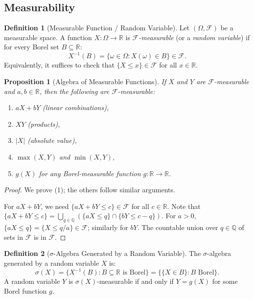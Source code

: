 \documentclass[11pt,a4paper]{article}
\theoremstyle{definition}
\newtheorem{definition}{Definition}[section]
\theoremstyle{plain}
\newtheorem{proposition}[theorem]{Proposition}
\theoremstyle{remark}
\newcommand{\R}{\mathbb{R}}
\begin{document}
\subsection{Measurability}
\label{subsec:measurability}

\begin{definition}[Measurable Function / Random Variable]
\label{def:measurable}
Let $(\Omega, \mathcal{F})$ be a measurable space. A function $X: \Omega \to \R$ is \emph{$\mathcal{F}$-measurable} (or a \emph{random variable}) if for every Borel set $B \subseteq \R$:
\begin{equation}
    X^{-1}(B) = \{\omega \in \Omega : X(\omega) \in B\} \in \mathcal{F}.
    \label{eq:measurable}
\end{equation}
Equivalently, it suffices to check that $\{X \leq x\} \in \mathcal{F}$ for all $x \in \R$.
\end{definition}

\begin{proposition}[Algebra of Measurable Functions]
\label{prop:measurable_algebra}
If $X$ and $Y$ are $\mathcal{F}$-measurable and $a, b \in \R$, then the following are $\mathcal{F}$-measurable:
\begin{enumerate}[nosep]
    \item $aX + bY$ (linear combinations),
    \item $XY$ (products),
    \item $|X|$ (absolute value),
    \item $\max(X, Y)$ and $\min(X, Y)$,
    \item $g(X)$ for any Borel-measurable function $g: \R \to \R$.
\end{enumerate}
\end{proposition}

\begin{proof}
We prove (1); the others follow similar arguments.

For $aX + bY$, we need $\{aX + bY \leq c\} \in \mathcal{F}$ for all $c \in \R$. Note that $\{aX + bY \leq c\} = \bigcup_{q \in \mathbb{Q}} (\{aX \leq q\} \cap \{bY \leq c - q\})$. For $a > 0$, $\{aX \leq q\} = \{X \leq q/a\} \in \mathcal{F}$; similarly for $bY$. The countable union over $q \in \mathbb{Q}$ of sets in $\mathcal{F}$ is in $\mathcal{F}$.
\end{proof}

\begin{definition}[$\sigma$-Algebra Generated by a Random Variable]
\label{def:sigma_rv}
The $\sigma$-algebra generated by a random variable $X$ is:
\begin{equation}
    \sigma(X) = \{X^{-1}(B) : B \subseteq \R \text{ is Borel}\} = \{\{X \in B\} : B \text{ Borel}\}.
    \label{eq:sigma_rv}
\end{equation}
A random variable $Y$ is $\sigma(X)$-measurable if and only if $Y = g(X)$ for some Borel function $g$.
\end{definition}
\end{document}
